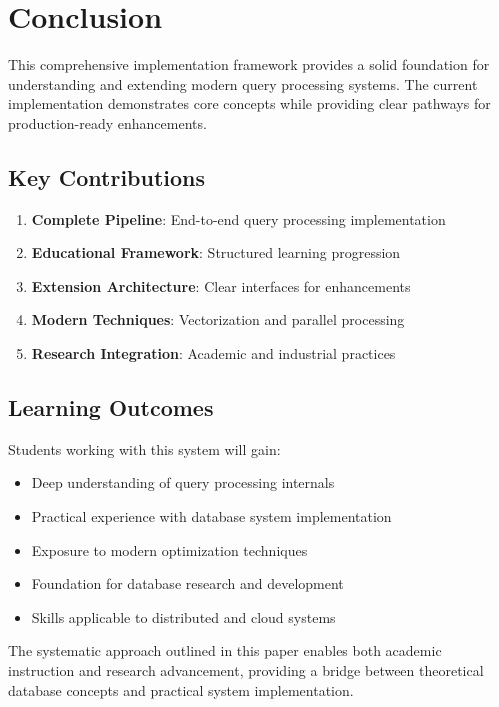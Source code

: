 \documentclass[12pt,a4paper]{article}
\begin{document}
\section{Conclusion}

This comprehensive implementation framework provides a solid foundation for understanding and extending modern query processing systems. The current implementation demonstrates core concepts while providing clear pathways for production-ready enhancements.

\subsection{Key Contributions}

\begin{enumerate}
    \item \textbf{Complete Pipeline}: End-to-end query processing implementation
    \item \textbf{Educational Framework}: Structured learning progression
    \item \textbf{Extension Architecture}: Clear interfaces for enhancements
    \item \textbf{Modern Techniques}: Vectorization and parallel processing
    \item \textbf{Research Integration}: Academic and industrial practices
\end{enumerate}

\subsection{Learning Outcomes}

Students working with this system will gain:

\begin{itemize}
    \item Deep understanding of query processing internals
    \item Practical experience with database system implementation
    \item Exposure to modern optimization techniques
    \item Foundation for database research and development
    \item Skills applicable to distributed and cloud systems
\end{itemize}

The systematic approach outlined in this paper enables both academic instruction and research advancement, providing a bridge between theoretical database concepts and practical system implementation.
\end{document}
